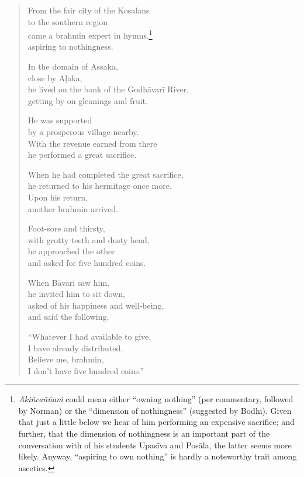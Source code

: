 \documentclass[12pt,openany]{book}%
\begin{document}
\begin{verse}%
From the fair city of the Kosalans \\
to the southern region \\
came a brahmin expert in hymns,\footnote{\textit{\textsanskrit{Ākiñcaññaṁ}} could mean either “owning nothing” (per commentary, followed by Norman) or the “dimension of nothingness” (suggested by Bodhi). Given that just a little below we hear of him performing an expensive sacrifice; and further, that the dimension of nothingness is an important part of the conversation with of his students \textsanskrit{Upasīva} and \textsanskrit{Posāla}, the latter seems more likely. Anyway, “aspiring to own nothing” is hardly a noteworthy trait among ascetics. } \\
aspiring to nothingness. 

In the domain of Assaka, \\
close by \textsanskrit{Aḷaka}, \\
he lived on the bank of the \textsanskrit{Godhāvarī} River, \\
getting by on gleanings and fruit. 

He was supported \\
by a prosperous village nearby. \\
With the revenue earned from there \\
he performed a great sacrifice. 

When he had completed the great sacrifice, \\
he returned to his hermitage once more. \\
Upon his return, \\
another brahmin arrived. 

Foot-sore and thirsty, \\
with grotty teeth and dusty head, \\
he approached the other \\
and asked for five hundred coins. 

When \textsanskrit{Bāvari} saw him, \\
he invited him to sit down, \\
asked of his happiness and well-being, \\
and said the following. 

“Whatever I had available to give, \\
I have already distributed. \\
Believe me, brahmin, \\
I don’t have five hundred coins.” 


\end{verse}
\end{document}
